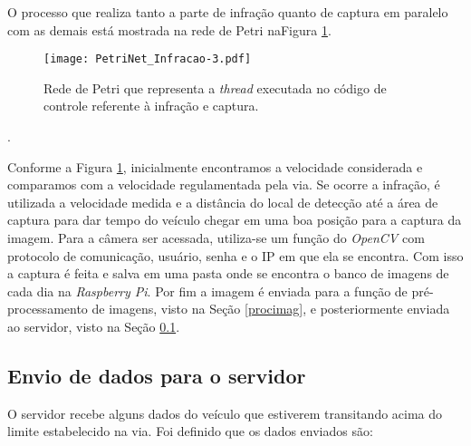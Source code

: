 O processo que realiza tanto a parte de infração quanto de captura em paralelo com as demais está mostrada na rede de Petri na{Figura \ref{Petricaptura}}.

\begin{figure}[H]
    \centering
    \texttt{[image: PetriNet\_Infracao-3.pdf]}
    \caption{Rede de Petri que representa a \emph{thread} executada no código de controle referente à infração e captura.}
    \label{Petricaptura}
    \end{figure}. 

Conforme a {Figura \ref{Petricaptura}}, inicialmente encontramos a velocidade considerada e comparamos com a velocidade regulamentada pela via. Se ocorre a infração, é utilizada a velocidade medida e a distância do local de detecção até a área de captura para dar tempo do veículo chegar em uma boa posição para a captura da imagem. Para a câmera ser acessada, utiliza-se um função do \emph{OpenCV} com protocolo de comunicação, usuário, senha e o IP em que ela se encontra. Com isso a captura é feita e salva em uma pasta onde se encontra o banco de imagens de cada dia na \emph{Raspberry Pi}. Por fim a imagem é enviada para a função de pré-processamento de imagens, visto na Seção \ref{procimag}, e posteriormente enviada ao servidor, visto na Seção \ref{serv}.

\subsection{Envio de dados para o servidor} \label{serv}
    
O servidor recebe alguns dados do veículo que estiverem transitando acima do limite estabelecido na via. Foi definido que os dados enviados são: 

